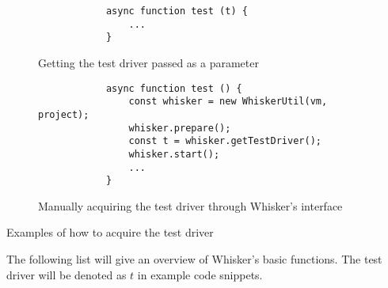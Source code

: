 \begin{listing}[ht]
    \centering
    \begin{subfigure}[b]{.35\textwidth}
        \begin{verbatim}
            async function test (t) {
                ...
            }
        \end{verbatim}
        \vspace{-\bigskipamount}
        \caption{Getting the test driver passed as a parameter}
    \end{subfigure}
    \hspace{.05\textwidth}
    \begin{subfigure}[b]{.50\textwidth}
        \begin{verbatim}
            async function test () {
                const whisker = new WhiskerUtil(vm, project);
                whisker.prepare();
                const t = whisker.getTestDriver();
                whisker.start();
                ...
            }
        \end{verbatim}
        \vspace{-\bigskipamount}
        \caption{Manually acquiring the test driver through Whisker's interface}
    \end{subfigure}
    \caption{Examples of how to acquire the test driver}
    \label{fig:examples_of_how_to_acquire_the_test_driver}
\end{listing}

The following list will give an overview of Whisker's basic functions.
The test driver will be denoted as $t$ in example code snippets.

